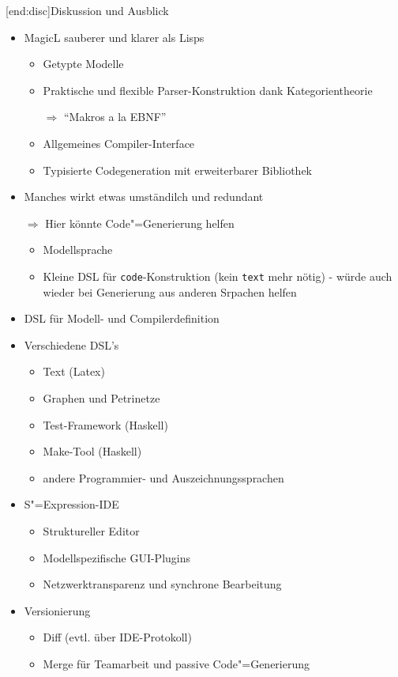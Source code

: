 \documentclass[11pt, a4paper, bibgerm]{scrbook}
\newcommand\icode[1]{\lstinline?#1?}
\newcommand\lsection{}
\newcommand{\sexp}{S"=Expression}
\newcommand{\cgen}{Code"=Generierung}
\begin{document}
\lsection[end:disc]{Diskussion und Ausblick}

  \begin{itemize}
  \item MagicL sauberer und klarer als Lisps
    \begin{itemize}
    \item Getypte Modelle
    \item Praktische und flexible Parser-Konstruktion dank Kategorientheorie
    \item[$\Rightarrow$] "`Makros a la EBNF"'
    \item Allgemeines Compiler-Interface
    \item Typisierte Codegeneration mit erweiterbarer Bibliothek
    \end{itemize}
  \item Manches wirkt etwas umständilch und redundant
  \item[$\Rightarrow$] Hier könnte \cgen{} helfen
    \begin{itemize}
    \item Modellsprache
    \item Kleine DSL für \icode{code}-Konstruktion (kein \icode{text}
      mehr nötig) - würde auch wieder bei Generierung aus anderen
      Srpachen helfen
    \end{itemize}
\item DSL für Modell- und Compilerdefinition
\item Verschiedene DSL's
  \begin{itemize}
  \item Text (Latex)
  \item Graphen und Petrinetze
  \item Test-Framework (Haskell)
  \item Make-Tool (Haskell)
  \item andere Programmier- und Auszeichnungssprachen
  \end{itemize}
\item \sexp{}-IDE
  \begin{itemize}
  \item Struktureller Editor
  \item Modellspezifische GUI-Plugins
  \item Netzwerktransparenz und synchrone Bearbeitung
  \end{itemize}
\item Versionierung
  \begin{itemize}
  \item Diff (evtl. über IDE-Protokoll)
  \item Merge für Teamarbeit und passive \cgen{}
  \end{itemize}
\end{itemize}
\end{document}
